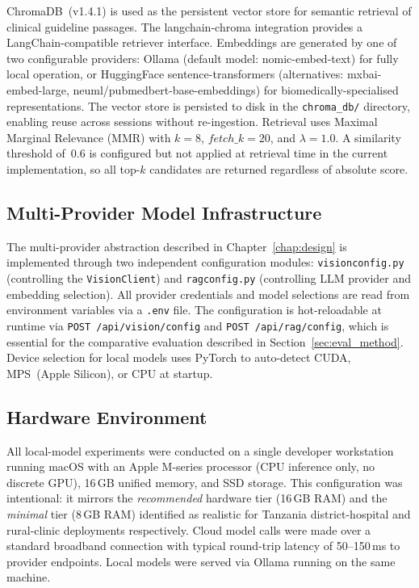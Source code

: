 \documentclass[12pt,a4paper]{report}
\begin{document}
ChromaDB~(v1.4.1) is used as the persistent vector store for semantic
retrieval of clinical guideline passages.  The langchain-chroma
integration provides a LangChain-compatible retriever interface.
Embeddings are generated by one of two configurable providers: Ollama
(default model: nomic-embed-text) for fully local operation, or
HuggingFace sentence-transformers (alternatives: mxbai-embed-large,
neuml/pubmedbert-base-embeddings) for biomedically-specialised
representations.  The vector store is persisted to disk in the
\texttt{chroma\_db/} directory, enabling reuse across sessions without
re-ingestion.  Retrieval uses Maximal Marginal Relevance (MMR) with
$k{=}8$, $\mathit{fetch\_k}{=}20$, and $\lambda{=}1.0$.  A similarity
threshold of~0.6 is configured but not applied at retrieval time in the
current implementation, so all top-$k$ candidates are returned
regardless of absolute score.

\subsection{Multi-Provider Model Infrastructure}
\label{subsec:providers}

The multi-provider abstraction described in Chapter~\ref{chap:design} is implemented
through two independent configuration modules: \texttt{visionconfig.py}
(controlling the \texttt{VisionClient}) and \texttt{ragconfig.py}
(controlling LLM provider and embedding selection).  All provider
credentials and model selections are read from environment variables via
a \texttt{.env} file.  The configuration is hot-reloadable at runtime
via \texttt{POST /api/vision/config} and \texttt{POST /api/rag/config},
which is essential for the comparative evaluation described in
Section~\ref{sec:eval_method}.  Device selection for local models uses
PyTorch to auto-detect CUDA, MPS~(Apple Silicon), or CPU at startup.

\subsection{Hardware Environment}
\label{subsec:hardware}

All local-model experiments were conducted on a single developer
workstation running macOS with an Apple M-series processor (CPU
inference only, no discrete GPU), 16\,GB unified memory, and SSD
storage.  This configuration was intentional: it mirrors the
\textit{recommended} hardware tier (16\,GB RAM) and the
\textit{minimal} tier (8\,GB RAM) identified as realistic for Tanzania
district-hospital and rural-clinic deployments respectively.  Cloud
model calls were made over a standard broadband connection with typical
round-trip latency of 50--150\,ms to provider endpoints.  Local models
were served via Ollama running on the same machine.
\end{document}
